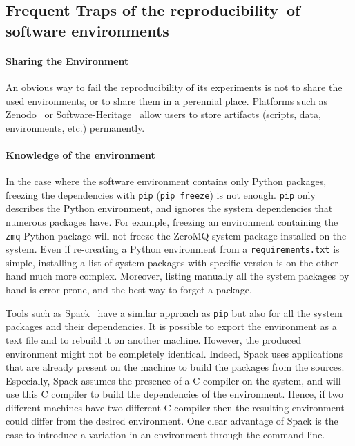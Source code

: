 \documentclass[sigconf,natbib=false]{acmart}
\newcommand{\repro}{reproducibility}
\begin{document}
\subsection{Frequent Traps of the \repro\ of software environments}\label{sec:expe:repro:sw}


\paragraph{Sharing the Environment}

An obvious way to fail the reproducibility of its experiments is not to share the used environments, or to share them in a perennial place.
Platforms such as Zenodo\ \cite{zenodo} or Software-Heritage\ \cite{swheritage} allow users to store artifacts (scripts, data, environments, etc.) permanently.


\paragraph{Knowledge of the environment}

In the case where the software environment contains only Python packages, freezing the dependencies with \texttt{pip} (\texttt{pip freeze}) is not enough.
\texttt{pip} only describes the Python environment, and ignores the system dependencies that numerous packages have. 
For example, freezing an environment containing the \texttt{zmq} Python package will not freeze the ZeroMQ system package installed on the system.  
Even if re-creating a Python environment from a \texttt{requirements.txt} is simple, installing a list of system packages with specific version is on the other hand much more complex.
Moreover, listing manually all the system packages by hand is error-prone, and the best way to forget a package.

Tools such as Spack\ \cite{gamblin_spack_2015} have a similar approach as \texttt{pip} but also for all the system packages and their dependencies.
It is possible to export the environment as a text file and to rebuild it on another machine.
However, the produced environment might not be completely identical.
Indeed, Spack uses applications that are already present on the machine to build the packages from the sources.
Especially, Spack assumes the presence of a C compiler on the system, and will use this C compiler to build the dependencies of the environment.
Hence, if two different machines have two different C compiler then the resulting environment could differ from the desired environment.
One clear advantage of Spack is the ease to introduce a variation in an environment through the command line.
\end{document}
